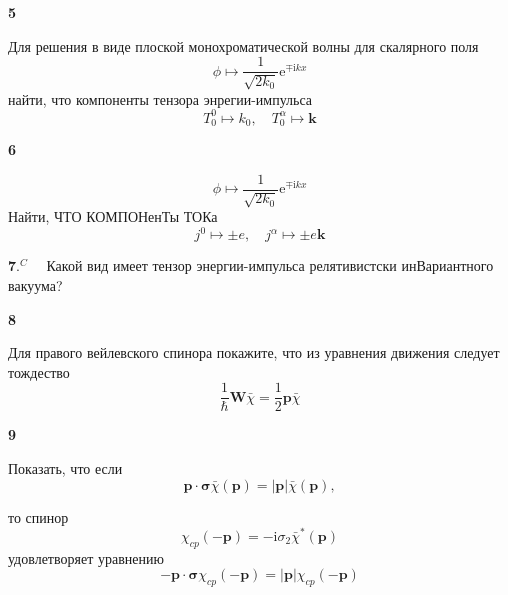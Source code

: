 \documentclass[a4paper,12pt]{article} %
\begin{document}
\begin{ttask}\textbf{5}

Для решения в виде плоской монохроматической волны для скалярного поля
$$
\phi \mapsto \frac{1}{\sqrt{2 k_{0}}} \mathrm{e}^{\mp \mathrm{i} k x}
$$
найти, что компоненты тензора энрегии-импульса
$$
T_{0}^{0} \mapsto k_{0}, \quad T_{0}^{\alpha} \mapsto \boldsymbol{k}
$$





\end{ttask}



\begin{ttask}\textbf{6}


$$
\phi \mapsto \frac{1}{\sqrt{2 k_{0}}} \mathrm{e}^{\mp \mathrm{i} k x}
$$
Найти, ЧТО КОМПОНенТы ТОКа
$$
j^{0} \mapsto \pm e, \quad j^{\alpha} \mapsto \pm e \boldsymbol{k}
$$


\end{ttask}



\begin{ttask}

$\mathbf{7} .^{C} \quad$ Какой вид имеет тензор энергии-импульса релятивистски инВариантного вакуума?


\end{ttask}



\begin{ttask}\textbf{8}


Для правого вейлевского спинора покажите, что из уравнения движения следует тождество
$$
\frac{1}{\hbar} \boldsymbol{W} \bar{\chi}=\frac{1}{2} \boldsymbol{p} \bar{\chi}
$$






\end{ttask}



\begin{ttask}\textbf{9}


Показать, что если
$$
\boldsymbol{p} \cdot \boldsymbol{\sigma} \bar{\chi}(\boldsymbol{p})=|\boldsymbol{p}| \bar{\chi}(\boldsymbol{p}),
$$

то спинор
$$
\chi_{c p}(-\boldsymbol{p})=-\mathrm{i} \sigma_{2} \bar{\chi}^{*}(\boldsymbol{p})
$$
удовлетворяет уравнению
$$
-\boldsymbol{p} \cdot \boldsymbol{\sigma} \chi_{c p}(-\boldsymbol{p})=|\boldsymbol{p}| \chi_{c p}(-\boldsymbol{p})
$$


\end{ttask}
\end{document}
